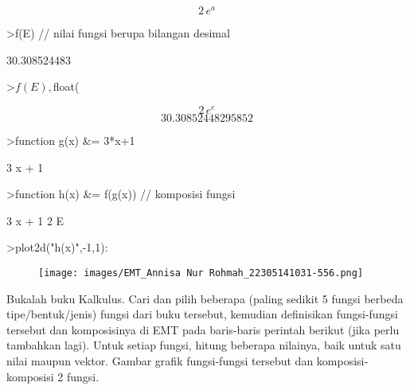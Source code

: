 \documentclass[a4paper,10pt]{article}
\begin{document}
\begin{eulernotebook}
\begin{euleroutput}
\end{euleroutput}
\begin{eulerformula}
\[
2\,e^{a}
\]
\end{eulerformula}
\begin{eulerprompt}
>f(E) // nilai fungsi berupa bilangan desimal
\end{eulerprompt}
\begin{euleroutput}
  30.308524483
\end{euleroutput}
\begin{eulerprompt}
>$f(E), $float(%
\end{eulerprompt}
\begin{eulerformula}
\[
2\,e^{e}
\]
\[
30.30852448295852
\]
\end{eulerformula}
\begin{eulerprompt}
>function g(x) &= 3*x+1
\end{eulerprompt}
\begin{euleroutput}
  
                                 3 x + 1
  
\end{euleroutput}
\begin{eulerprompt}
>function h(x) &= f(g(x)) // komposisi fungsi
\end{eulerprompt}
\begin{euleroutput}
  
                                   3 x + 1
                                2 E
  
\end{euleroutput}
\begin{eulerprompt}
>plot2d("h(x)",-1,1):
\end{eulerprompt}
\begin{figure}[h]
    \centering
    \texttt{[image: images/EMT\_Annisa Nur Rohmah\_22305141031-556.png]}
\end{figure}
\begin{eulercomment}
Bukalah buku Kalkulus. Cari dan pilih beberapa (paling sedikit 5 fungsi berbeda
tipe/bentuk/jenis) fungsi dari buku tersebut, kemudian definisikan fungsi-fungsi tersebut dan
komposisinya di EMT pada baris-baris perintah berikut (jika perlu tambahkan lagi). Untuk setiap
fungsi, hitung beberapa nilainya, baik untuk satu nilai maupun vektor. Gambar grafik
fungsi-fungsi tersebut dan komposisi-komposisi 2 fungsi.


\end{eulercomment}
\end{eulernotebook}
\end{document}
